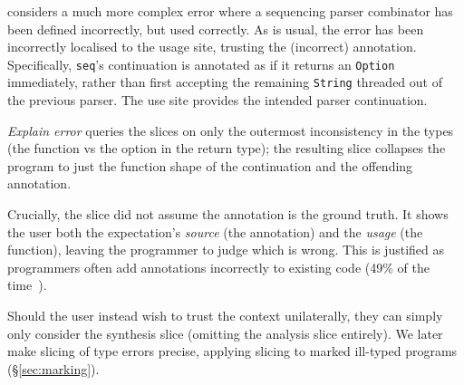 { considers a much more complex error where a sequencing parser combinator has been defined incorrectly, but used correctly. As is usual, the error has been incorrectly localised to the usage site, trusting the (incorrect) annotation. Specifically, \texttt{seq}'s continuation is annotated as if it returns an \texttt{Option} immediately, rather than first accepting the remaining \texttt{String} threaded out of the previous parser. The use site provides the intended parser continuation.

\emph{Explain error} queries the slices on only the outermost inconsistency in the types (the function vs the option in the return type); the resulting slice collapses the program to just the function shape of the continuation and the offending annotation.

Crucially, the slice did not assume the annotation is the ground truth. It shows the user both the expectation's \emph{source} (the annotation) and the \emph{usage} (the function), leaving the programmer to judge which is wrong. This is justified as programmers often add annotations incorrectly to existing code (49\% of the time~\cite{TypeAnnotationStudy}).} Should the user instead wish to trust the context unilaterally, they can simply only consider the synthesis slice (omitting the analysis slice entirely). We later make slicing of type errors precise, applying slicing to marked ill-typed programs (\S\ref{sec:marking}).


